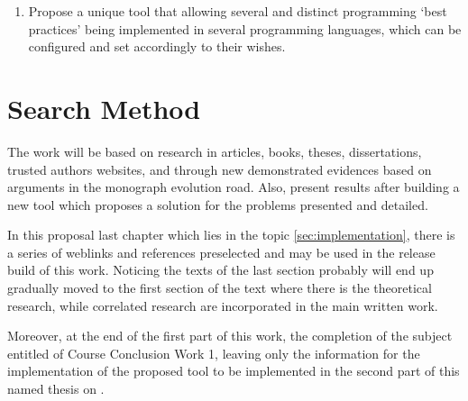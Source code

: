 {\begin{enumerate}
        \item Propose a unique tool that allowing several and distinct programming `best practices'
        being implemented in several programming languages, which can be configured and set
        accordingly to their wishes.
    \end{enumerate}

    \section{Search Method}

    The work will be based on research in articles, books, theses, dissertations, trusted authors
    websites, and through new demonstrated evidences based on arguments in the monograph evolution
    road. Also, present results after building a new tool which proposes a solution for the problems
    presented and detailed.

    In this proposal last chapter which lies in the topic \autoref{sec:implementation}, there is a
    series of weblinks and references preselected and may be used in the release build of this work.
    Noticing the texts of the last section probably will end up gradually moved to the first section
    of the text where there is the theoretical research, while correlated research are incorporated
    in the main written work.

    Moreover, at the end of the first part of this work, the completion of the subject entitled of
    Course Conclusion Work 1, leaving only the information for the implementation of the proposed
    tool to be implemented in the second part of this named thesis on .
}
